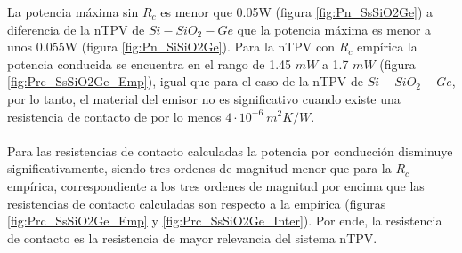 La potencia máxima sin $R_c$ es menor que 0.05W (figura \ref{fig:Pn_SsSiO2Ge}) a diferencia de la nTPV de $Si-SiO_2-Ge$ que la potencia máxima es menor a unos 0.055W (figura \ref{fig:Pn_SiSiO2Ge}). Para la nTPV con $R_c$ empírica la potencia conducida se encuentra en el rango de 1.45 $mW$ a 1.7 $mW$ (figura \ref{fig:Prc_SsSiO2Ge_Emp}), igual que para el caso de la nTPV de $Si-SiO_2-Ge$, por lo tanto, el material del emisor no es significativo cuando existe una resistencia de contacto de por lo menos $4\cdot 10^{-6} \ m^2 K/W$.\\\\
Para las resistencias de contacto calculadas la potencia por conducción disminuye significativamente, siendo tres ordenes de magnitud menor que para la $R_c$ empírica, correspondiente a los tres ordenes de magnitud por encima que las resistencias de contacto calculadas son respecto a la empírica (figuras \ref{fig:Prc_SsSiO2Ge_Emp} y \ref{fig:Prc_SsSiO2Ge_Inter}). Por ende, la resistencia de contacto es la resistencia de mayor relevancia del sistema nTPV.
